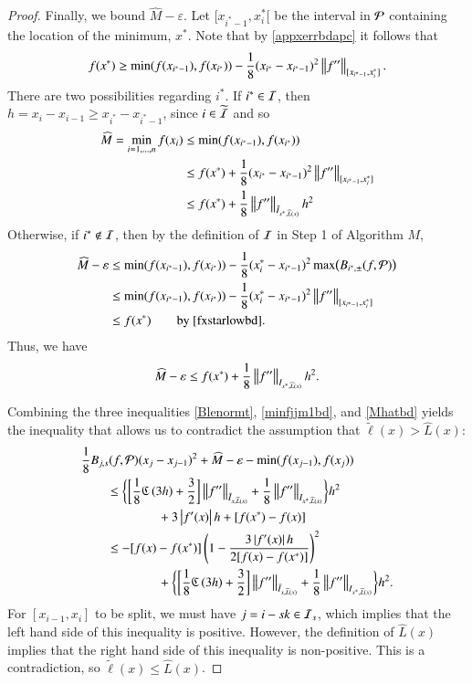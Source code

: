 \documentclass[review]{elsarticle}
\newcommand{\abstol}{\varepsilon}
\theoremstyle{definition}
\newcommand{\tell}{\tilde{\ell}}
\newcommand{\chL}{\widehat{L}}
\newcommand{\hM}{\widehat{M}}
\begin{document}
\begin{proof}
Finally, we bound $ \widehat{M}-\abstol$.  Let $[x_{i^*-1}, x^*_i[$ be the interval in $\cp$ containing the location of the minimum, $x^*$.  Note that by \eqref{appxerrbdapc} it follows that
\begin{equation} \label{fxstarlowbd}
f(x^*) \ge \min(f(x_{i^*-1}),f(x_{i^*})) - \frac18 (x_{i^*} - x_{i^*-1})^2\norm[{[x_{i^*-1}, x^*_i]}]{f''}.
\end{equation}
There are two possibilities regarding $i^*$.  If $i^* \in \ci$, then $h = x_i -  x_{i-1} \ge x_{i^*} -  x_{i^*-1}$, since $i \in \widetilde{\ci}$ and so
\begin{align*}
\hM  = \min_{i=1, \ldots, n} f(x_i) & \le \min(f(x_{i^*-1}),f(x_{i^*})) \\
& \le f(x^*) + \frac18  (x_{i^*} - x_{i^*-1})^2\norm[{[x_{i^*-1}, x^*_i]}]{f''} \\
& \le  f(x^*) + \frac18 \norm[{\bar{I}_{x^*,\chL(x)}}]{f''} h^2
\end{align*}
Otherwise, if $i^* \notin \ci$, then by the definition of $\ci$ in Step 1 of Algorithm $M$,
\begin{align*}
\hM   - \abstol & \le \min(f(x_{i^*-1}),f(x_{i^*})) - \frac18 (x^*_i - x_{i^*-1})^2 \max \bigl(B_{i^*,\pm}(f,\cp) \bigr)  \\
& \le \min(f(x_{i^*-1}),f(x_{i^*})) - \frac18 (x^*_i - x_{i^*-1})^2 \norm[{[x_{i^*-1}, x^*_i]}]{f''}   \\
& \le  f(x^*) \qquad \text{by}~\eqref{fxstarlowbd} .
\end{align*}
Thus, we have
\begin{equation} \label{Mhatbd}
\hM - \abstol \le f(x^*) + \frac 18 \norm[{I_{x^*,\chL(x)}}]{f''} h^2.
\end{equation}

Combining the three inequalities \eqref{Blenormt}, \eqref{minfjjm1bd}, and \eqref{Mhatbd} yields the inequality that allows us to contradict the assumption that $\tell(x) > \chL(x)$:
\begin{align*}
\MoveEqLeft{\frac 18 B_{j,s}(f,\cp)(x_j-x_{j-1})^2 + \hM -\abstol - \min(f(x_{j-1}),f(x_{j}))} \\
& \le \biggl\{ \biggl[\frac 18 \fC\left(3h\right) + \frac 32 \biggr]   \norm[\bar{I}_{x,\chL(x)}]{f''} + \frac18\norm[{I_{x^*,\chL(x)}}]{f''} \biggr\} h^2 \\
& \qquad \qquad +  3 \abs{f'(x)} h + [f(x^*) - f(x)] \\
&  \le -[f(x) - f(x^*)] \left( 1 - \frac{3\abs{f'(x)}h}{2[f(x) - f(x^*)] } \right)^2  \\
& \qquad \qquad  +  \biggl\{ \biggl[\frac 18 \fC\left(3h\right) + \frac 32 \biggr]   \norm[\bar{I}_{x,\chL(x)}]{f''} + \frac18\norm[{I_{x^*,\chL(x)}}]{f''} \biggr\} h^2.
\end{align*}
For $[x_{i-1},x_i]$ to be split, we must have $j = i - sk \in \ci_s$, which implies that the left hand side of this inequality is positive.  However, the definition of $\chL(x)$ implies that the right hand side of this inequality is non-positive.  This is a contradiction, so $\tell(x) \le \chL(x)$.
\end{proof}
\end{document}

